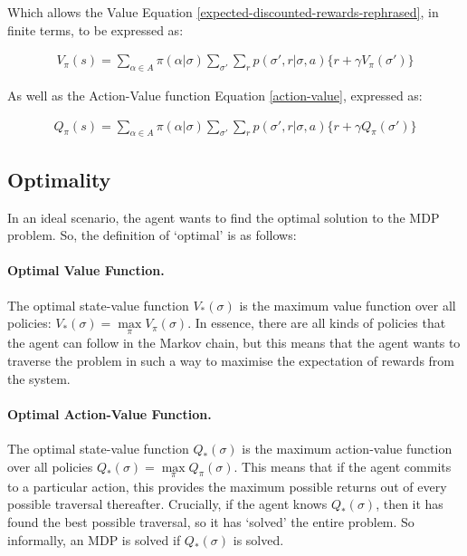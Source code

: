 \documentclass[ %
                    author={Ashwinder Khurana},
                supervisor={Prof Dave Cliff},
                    degree={MEng},
                     title={The Deeply Reinforced Trader},
                  subtitle={},
                      type={enterprise},
                      year={2020} ]{dissertation}
\begin{document}
{\noindent
Which allows the Value Equation \ref{expected-discounted-rewards-rephrased}, in finite terms, to be expressed as:

\begin{equation}
\label{value-function-bellman}
\begin{split}
V_\pi(s) = \sum\limits^{}_{\alpha \in A}{\pi(\alpha | \sigma)} \sum\limits^{}_{\sigma'}{\sum\limits^{}_{r}{p(\sigma' , r | \sigma, a) \{r + \gamma V_\pi(\sigma')\}}}
\end{split}
\end{equation}

\noindent
As well as the Action-Value function Equation \ref{action-value}, expressed as:

\begin{equation}
\label{action-value-bellman}
\begin{split}
Q_\pi(s) = \sum\limits^{}_{\alpha \in A}{\pi(\alpha | \sigma)} \sum\limits^{}_{\sigma'}{\sum\limits^{}_{r}{p(\sigma' , r | \sigma, a) \{r + \gamma Q_\pi(\sigma')\}}}
\end{split}
\end{equation}
\vspace{0.5cm}

\subsection{Optimality}
\label{Optimality}

In an ideal scenario, the agent wants to find the optimal solution to the MDP problem. So, the definition of \enquote*{optimal} is as follows:

\paragraph{Optimal Value Function.} The optimal state-value function $V_*(\sigma)$ is the maximum value function over all policies: $V_*(\sigma) = \max\limits_\pi V_\pi(\sigma)$. In essence, there are all kinds of policies that the agent can follow in the Markov chain, but this means that the agent wants to traverse the problem in such a way to maximise the expectation of rewards from the system. 
 
\paragraph{Optimal Action-Value Function.} The optimal state-value function $Q_*(\sigma)$ is the maximum action-value function over all policies $Q_*(\sigma) = \max\limits_\pi Q_\pi(\sigma)$. This means that if the agent commits to a particular action, this provides the maximum possible returns out of every possible traversal thereafter. Crucially, if the agent knows $Q_*(\sigma)$, then it has found the best possible traversal, so it has \enquote*{solved} the entire problem. So informally, an MDP is solved if  $Q_*(\sigma)$ is solved.

}
\end{document}
